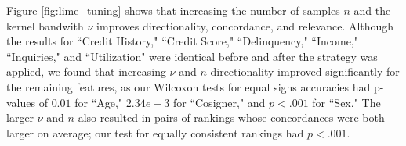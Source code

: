 \documentclass[mnsc,blindrev]{informs3}
\begin{document}
            Figure \ref{fig:lime_tuning} shows that increasing the number of samples $n$ and the kernel bandwith $\nu$ improves directionality, concordance, and relevance. Although the results for ``Credit History," ``Credit Score," ``Delinquency," ``Income," ``Inquiries," and ``Utilization" were identical before and after the strategy was applied, we found that increasing $\nu$ and $n$ directionality improved significantly for the remaining features, as our Wilcoxon tests for equal signs accuracies had p-values of $0.01$ for ``Age," $2.34e-3$ for ``Cosigner," and $p<.001$ for ``Sex." The larger $\nu$ and $n$ also resulted in pairs of rankings whose concordances were both larger on average; our test for equally consistent rankings had $p<.001$. %
        
\end{document}
